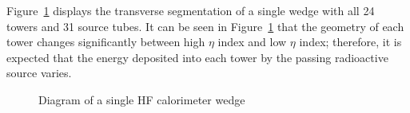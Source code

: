 Figure~\ref{fig:hf_description_wedgediagram} displays the transverse segmentation of a single wedge with all 24 towers and 31 source tubes. It can be seen in Figure~\ref{fig:hf_description_wedgediagram} that the geometry of each tower changes significantly between high $\eta$ index and low $\eta$ index; therefore, it is expected that the energy deposited into each tower by the passing radioactive source varies.
\begin{figure}[H]
   \begin{center}
      \caption{Diagram of a single HF calorimeter wedge}
      \label{fig:hf_description_wedgediagram}
   \end{center}
\end{figure}

